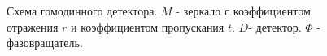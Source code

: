 \begin{figure}
\centering



\caption{Схема гомодинного детектора. $M$ - зеркало с коэффициентом
  отражения $r$ и коэффициентом пропускания $t$. $D$- детектор. $\Phi$
- фазовращатель.} 
\label{figPart3Squeezed_12}
\end{figure}
